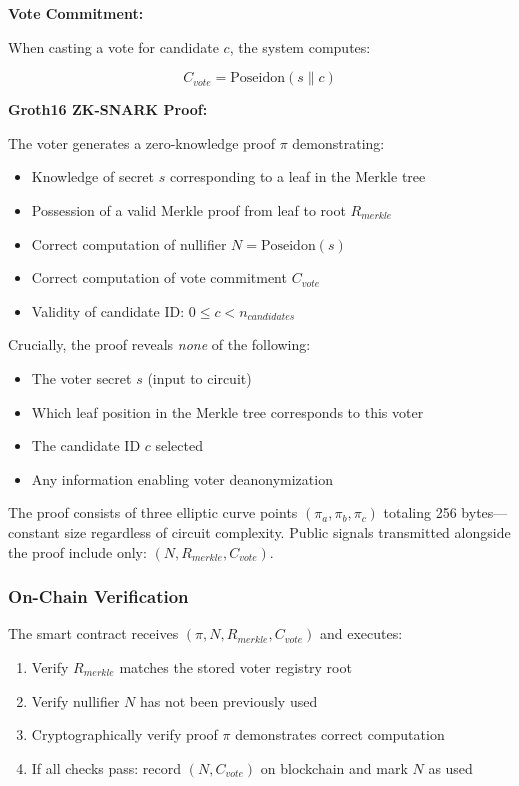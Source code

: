 \documentclass[conference]{IEEEtran}
\begin{document}
\textbf{Vote Commitment:}

When casting a vote for candidate $c$, the system computes:

\begin{equation}
C_{vote} = \text{Poseidon}(s \parallel c)
\end{equation}

\textbf{Groth16 ZK-SNARK Proof:}

The voter generates a zero-knowledge proof $\pi$ demonstrating:

\begin{itemize}
    \item Knowledge of secret $s$ corresponding to a leaf in the Merkle tree
    \item Possession of a valid Merkle proof from leaf to root $R_{merkle}$
    \item Correct computation of nullifier $N = \text{Poseidon}(s)$
    \item Correct computation of vote commitment $C_{vote}$
    \item Validity of candidate ID: $0 \leq c < n_{candidates}$
\end{itemize}

Crucially, the proof reveals \textit{none} of the following:
\begin{itemize}
    \item The voter secret $s$ (input to circuit)
    \item Which leaf position in the Merkle tree corresponds to this voter
    \item The candidate ID $c$ selected
    \item Any information enabling voter deanonymization
\end{itemize}

The proof consists of three elliptic curve points $(\pi_a, \pi_b, \pi_c)$ totaling 256 bytes---constant size regardless of circuit complexity. Public signals transmitted alongside the proof include only: $(N, R_{merkle}, C_{vote})$.

\subsubsection{On-Chain Verification}

The smart contract receives $(\pi, N, R_{merkle}, C_{vote})$ and executes:

\begin{enumerate}
    \item Verify $R_{merkle}$ matches the stored voter registry root
    \item Verify nullifier $N$ has not been previously used
    \item Cryptographically verify proof $\pi$ demonstrates correct computation
    \item If all checks pass: record $(N, C_{vote})$ on blockchain and mark $N$ as used
\end{enumerate}
\end{document}
